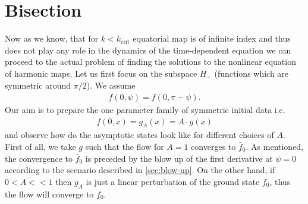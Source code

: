 \section{Bisection}
\label{sec:bisection}

Now as we know, that for $k<k_{\text{crit}}$ equatorial map is of infinite
index and thus does not play any role in the dynamics of the
time-dependent equation we can proceed to the actual problem of
finding the solutions to the nonlinear equation of harmonic maps. Let
us first focus on the subspace $H_+$ (functions which are symmetric around
$\pi/2$). We assume
\begin{align}
  f(0,\psi)=f(0,\pi-\psi).
\end{align}
Our aim is to prepare the one parameter family of symmetric initial
data i.e.
\begin{align}
  f(0,x)=g_A(x)=A\cdot g(x)
\end{align}
and observe how do the asymptotic states look like for different
choices of $A$. First of all, we take $g$ such that the flow for $A=1$
converges to $\bar{f}_0$. As mentioned, the convergence to $\bar{f}_0$
is preceded by the blow up of the first derivative at $\psi=0$
according to the scenario described in \ref{sec:blow-up}.  On
the other hand, if $0<A<<1$ then $g_A$ is just a linear perturbation
of the ground state $f_0$, thus the flow will converge to
$f_0$.




